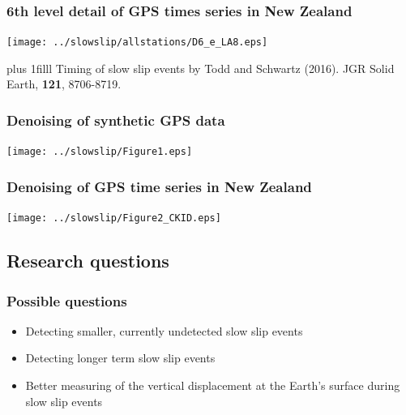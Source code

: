 \documentclass{beamer}
\newcommand{\btVFill}{\vskip0pt plus 1filll}
\begin{document}
	\begin{frame}
		\frametitle{6th level detail of GPS times series in New Zealand}
		\begin{center}
			\texttt{[image: ../slowslip/allstations/D6\_e\_LA8.eps]}
		\end{center}
		\btVFill
		\tiny{Timing of slow slip events by Todd and Schwartz (2016). JGR Solid Earth, \textbf{121}, 8706-8719.}
	\end{frame}

	\begin{frame}
		\frametitle{Denoising of synthetic GPS data}
		\begin{center}
			\texttt{[image: ../slowslip/Figure1.eps]}
		\end{center}
	\end{frame}

	\begin{frame}
		\frametitle{Denoising of GPS time series in New Zealand}
		\begin{center}
			\texttt{[image: ../slowslip/Figure2\_CKID.eps]}
		\end{center}
	\end{frame}


	\subsection{Research questions}

	\begin{frame}
		\frametitle{Possible questions}
		\begin{itemize}
			\item Detecting smaller, currently undetected slow slip events
			\item Detecting longer term slow slip events
			\item Better measuring of the vertical displacement at the Earth's surface during slow slip events
		\end{itemize}
	\end{frame}

\end{document}

